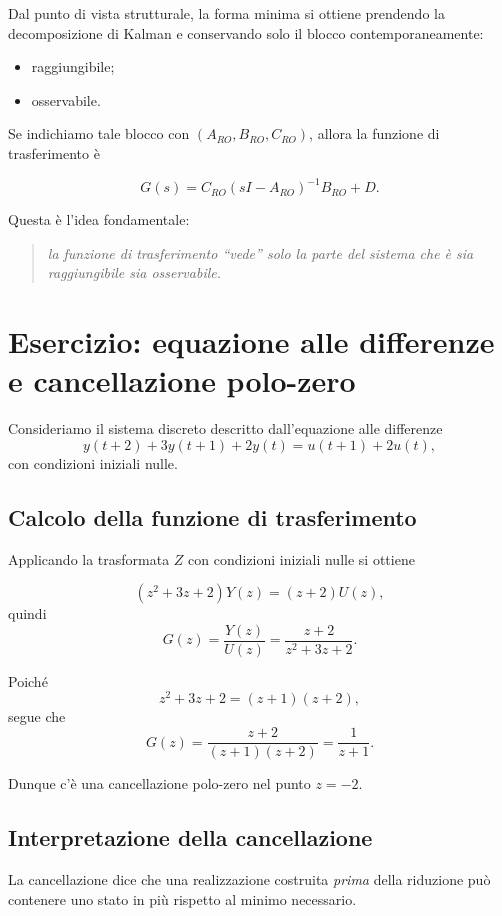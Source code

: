 Dal punto di vista strutturale, la forma minima si ottiene prendendo la decomposizione di Kalman e conservando solo il blocco contemporaneamente:
\begin{itemize}
    \item raggiungibile;
    \item osservabile.
\end{itemize}

Se indichiamo tale blocco con \((A_{RO},B_{RO},C_{RO})\), allora la funzione di trasferimento è

\[
G(s)=C_{RO}(sI-A_{RO})^{-1}B_{RO}+D.
\]

Questa è l'idea fondamentale:
\begin{quote}
\emph{la funzione di trasferimento ``vede'' solo la parte del sistema che è sia raggiungibile sia osservabile.}
\end{quote}

\bigskip

\section{Esercizio: equazione alle differenze e cancellazione polo-zero}

Consideriamo il sistema discreto descritto dall'equazione alle differenze
\[
y(t+2)+3y(t+1)+2y(t)=u(t+1)+2u(t),
\]
con condizioni iniziali nulle.

\subsection{Calcolo della funzione di trasferimento}

Applicando la trasformata \(Z\) con condizioni iniziali nulle si ottiene

\[
(z^2+3z+2)Y(z)=(z+2)U(z),
\]
quindi
\[
G(z)=\frac{Y(z)}{U(z)}=\frac{z+2}{z^2+3z+2}.
\]

Poiché
\[
z^2+3z+2=(z+1)(z+2),
\]
segue che
\[
G(z)=\frac{z+2}{(z+1)(z+2)}=\frac{1}{z+1}.
\]

Dunque c'è una cancellazione polo-zero nel punto \(z=-2\).

\subsection{Interpretazione della cancellazione}

La cancellazione dice che una realizzazione costruita \emph{prima} della riduzione può contenere uno stato in più rispetto al minimo necessario.

